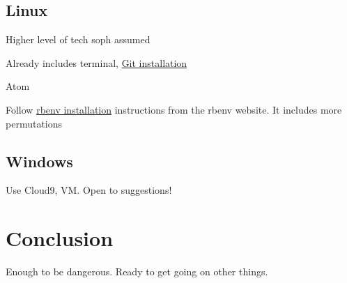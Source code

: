 
\subsection{Linux} %
\label{sec:linux}

Higher level of tech soph assumed

Already includes terminal, \href{https://git-scm.com/download/linux}{Git installation}

Atom

Follow \href{https://github.com/rbenv/rbenv#installation}{rbenv installation} instructions from the rbenv website. It includes more permutations


\subsection{Windows} %
\label{sec:windows}

Use Cloud9, VM. Open to suggestions!



\section{Conclusion} %
\label{sec:conclusion}

Enough to be dangerous. Ready to get going on other things.

